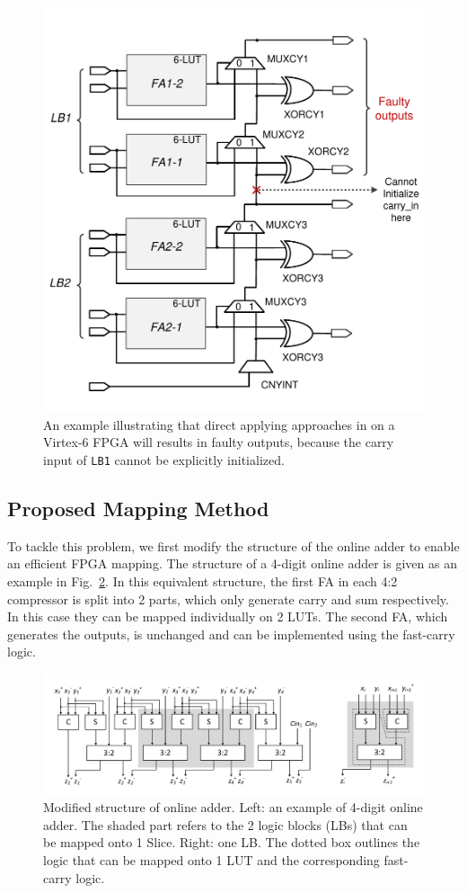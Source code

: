 \documentclass[conference]{IEEEtran}
\begin{document}
\begin{figure}[tbp]
	\centering
	\includegraphics[width=.45\textwidth]{./Figures/SDadder_FastCarry_PreviousWork.pdf}
	\caption{An example illustrating that direct applying approaches in \cite{FPT09RA} on a Virtex-6 FPGA will results in faulty outputs, because the carry input of \texttt{LB1} cannot be explicitly initialized.}
	\label{Fig:PreWorkVirtex6}
    \vspace{-2ex}
\end{figure}

\subsection{Proposed Mapping Method}
To tackle this problem, we first modify the structure of the online adder to enable an efficient FPGA mapping. The structure of a 4-digit online adder is given as an example in Fig.~\ref{Fig:ModifiedOA}. In this equivalent structure, the first FA in each 4:2 compressor is split into 2 parts, which only generate carry and sum respectively. In this case they can be mapped individually on 2 LUTs. The second FA, which generates the outputs, is unchanged and can be implemented using the fast-carry logic.



\begin{figure}[tbp]
	\centering
	\includegraphics[width=.85\textwidth]{./Figures/SDadder_FPGA_New_4digit2.pdf}
	\caption{Modified structure of online adder. Left: an example of 4-digit online adder. The shaded part refers to the 2 logic blocks (LBs) that can be mapped onto 1 Slice. Right: one LB. The dotted box outlines the logic that can be mapped onto 1 LUT and the corresponding fast-carry logic.}
	\vspace{-1ex}	
	\label{Fig:ModifiedOA}
\end{figure}
\end{document}
